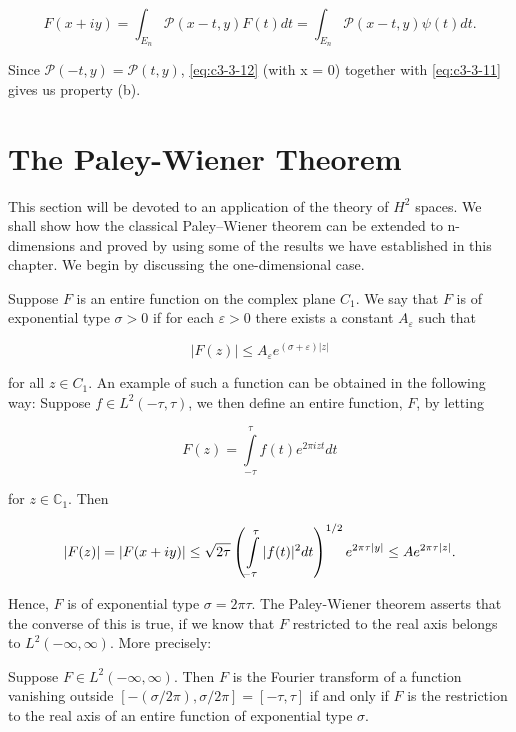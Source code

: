 \begin{equation}\label{eq:c3-3-12}
F(x+i y)=\int_{E_{n}}\mathcal{P}(x-t,y)F(t)d t=\int_{E_{n}}\mathcal{P}(x-t,y)\psi(t)d t.
\end{equation}

Since $\mathcal{P}(-t,y) = \mathcal{P}(t,y)$, \eqref{eq:c3-3-12} (with x = 0) together with \eqref{eq:c3-3-11} gives us property (b).

\section{The Paley-Wiener Theorem}

This section will be devoted to an application of the theory of $H^{2}$ spaces. We shall show how the classical Paley--Wiener theorem can be extended to n-dimensions and proved by using some of the results we have established in this chapter. We begin by discussing the one-dimensional case.

Suppose $F$ is an entire function on the complex plane $C_1$. We say that $F$ is of exponential type $\sigma > 0$ if for each $\varepsilon > 0$ there exists a constant $A_\varepsilon$ such that

\[
\left|F(z)\right|\leq A_{\varepsilon}e^{(\sigma+\varepsilon)|z|}
\]

for all $z \in C_1$. An example of such a function can be obtained in the following way: Suppose $f \in L^2(-\tau, \tau)$, we then define an entire function, $F$, by letting

\[
F(z)=\int\limits_{-\tau}^{\tau}f(t)e^{2\pi i z t}d t
\]

for $z \in \mathbb{C}_1$. Then

\[
|F(z)|=|F(x+i y)|\leq\sqrt{2\tau}\left(\intop_{-\tau}^{\tau}|f(t)|^{2}d t\right)^{1/2}e^{2\pi\tau|y|}\leq A e^{2\pi\tau|z|}.
\]

Hence, $F$ is of exponential type $\sigma = 2\pi\tau$. The Paley-Wiener theorem asserts that the converse of this is true, if we know that $F$ restricted to the real axis belongs to $L^{2}(-\infty, \infty)$. More precisely:

\begin{theorem}
\label{thm:c3-4-1}
Suppose $F \in L^2(-\infty, \infty)$. Then $F$ is the Fourier transform of a function vanishing outside $[-(\sigma/2\pi), \sigma/2\pi] = [-\tau, \tau]$ if and only if $F$ is the restriction to the real axis of an entire function of exponential type $\sigma$.
\end{theorem}

